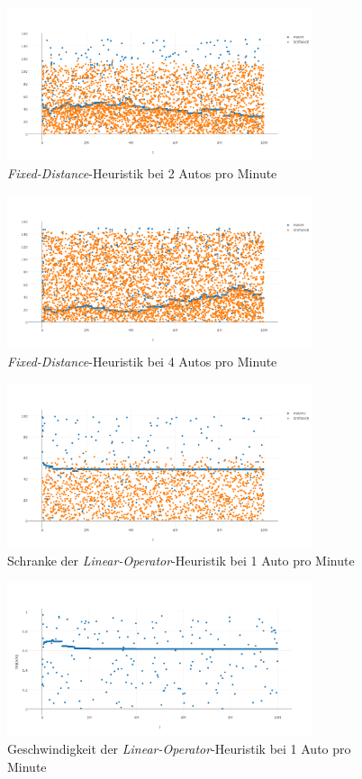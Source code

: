 \begin{figure}[H]
	\includegraphics[width=0.8\textwidth]{analyse/SingleMutant/fixeddistance2.png}
	\caption{\emph{Fixed-Distance}-Heuristik bei 2 Autos pro Minute}\label{fig:ap_sm_fd_2}
\end{figure}
\begin{figure}[H]
	\includegraphics[width=0.8\textwidth]{analyse/SingleMutant/fixeddistance4.png}
	\caption{\emph{Fixed-Distance}-Heuristik bei 4 Autos pro Minute}\label{fig:ap_sm_fd_4}
\end{figure}
\begin{figure}[H]
	\includegraphics[width=0.8\textwidth]{analyse/SingleMutant/linopzt1.png}
	\caption{Schranke der \emph{Linear-Operator}-Heuristik bei 1 Auto pro Minute}\label{fig:ap_sm_loz_1}
\end{figure}
\begin{figure}[H]
	\includegraphics[width=0.8\textwidth]{analyse/SingleMutant/linopa1.png}
	\caption{Geschwindigkeit der \emph{Linear-Operator}-Heuristik bei 1 Auto pro Minute}\label{fig:ap_sm_loa_1}
\end{figure}
